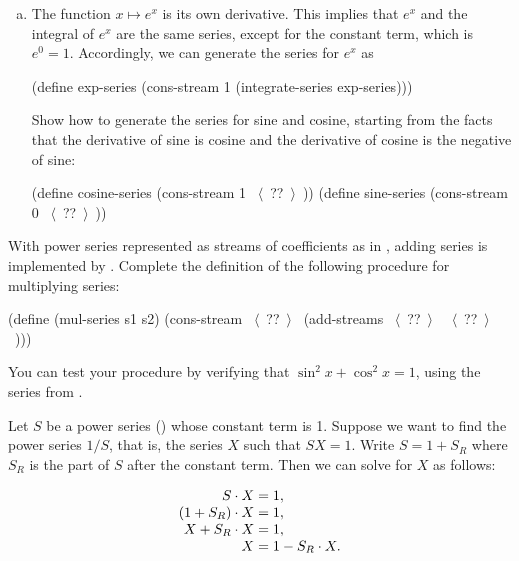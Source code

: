 \begin{exerciseGroup}
\begin{enumerate}[a.]
\item
The function \( x \mapsto e^x \) is its own derivative.  This implies that
\( e^x \) and the integral of \( e^x \) are the same series, except for the
constant term, which is \( e^0 = 1 \).  Accordingly, we can generate the series
for \( e^x \) as

\begin{codeBlock}
(define exp-series
  (cons-stream 1 (integrate-series exp-series)))
\end{codeBlock}

Show how to generate the series for sine and cosine, starting from the facts
that the derivative of sine is cosine and the derivative of cosine is the
negative of sine:

\begin{codeBlock}
(define cosine-series (cons-stream 1 ~\(\langle \)~??~\(\rangle \)~))
(define sine-series (cons-stream 0 ~\(\langle \)~??~\(\rangle \)~))
\end{codeBlock}
\end{enumerate}

\label{Exercise 3.60}
 With power series represented as
streams of coefficients as in , adding series is implemented
by .  Complete the definition of the following procedure for
multiplying series:

\begin{codeBlock}
(define (mul-series s1 s2)
  (cons-stream ~\(\langle \)~??~\(\rangle \)~ (add-streams ~\(\langle \)~??~\(\rangle \)~ ~\(\langle \)~??~\(\rangle \)~)))
\end{codeBlock}

You can test your procedure by verifying that \mbox{\( \sin^2\!x + \cos^2\!x = 1 \)},
using the series from .

\label{Exercise 3.61}
 Let \( S \) be a power series
() whose constant term is 1.  Suppose we want to find the
power series \( 1 / S \), that is, the series \( X \) such that \( SX = 1 \).
Write \( S = 1 + S_R \) where \( S_R \) is the part of \( S \) after the
constant term.  Then we can solve for \( X \) as follows:

$$
\begin{array}{r@{{}={}}l}
	        S \cdot X 	& 1, \\
	(1 + S_R) \cdot X 	& 1, \\
	  X + S_R \cdot X 	& 1, \\
	            	X 	& 1 - S_R \cdot X.
\end{array}
$$


\end{exerciseGroup}
